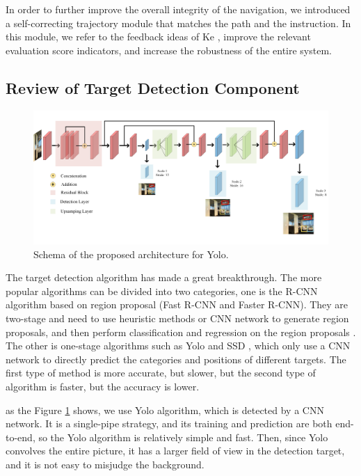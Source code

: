 In order to further improve the overall integrity of the navigation, we introduced a self-correcting trajectory module that matches the path and the instruction. In this module, we refer to the feedback ideas of Ke \cite{ke2019tactical}, improve the relevant evaluation score indicators, and increase the robustness of the entire system.

\subsection{Review of Target Detection Component}

\begin{figure}[h]
	\centering
	\includegraphics[scale=1]{image04.png}
	\caption{Schema of the proposed architecture for Yolo.}
	\label{image04}
\end{figure}
\vspace{-1em}
The target detection algorithm has made a great breakthrough. The more popular algorithms can be divided into two categories, one is the R-CNN algorithm based on region proposal (Fast R-CNN and Faster R-CNN). They are two-stage and need to use heuristic methods or CNN network to generate region proposals, and then perform classification and regression on the region proposals \cite{mao2019mini,girshick2015fast}. The other is one-stage algorithms such as Yolo and SSD , which only use a CNN network to directly predict the categories and positions of different targets. The first type of method is more accurate, but slower, but the second type of algorithm is faster, but the accuracy is lower.
	
as the Figure \ref{image04} shows, we use Yolo algorithm, which is detected by a CNN network. It is a single-pipe strategy, and its training and prediction are both end-to-end, so the Yolo algorithm is relatively simple and fast. Then, since Yolo convolves the entire picture, it has a larger field of view in the detection target, and it is not easy to misjudge the background.
\vspace{-1em}
